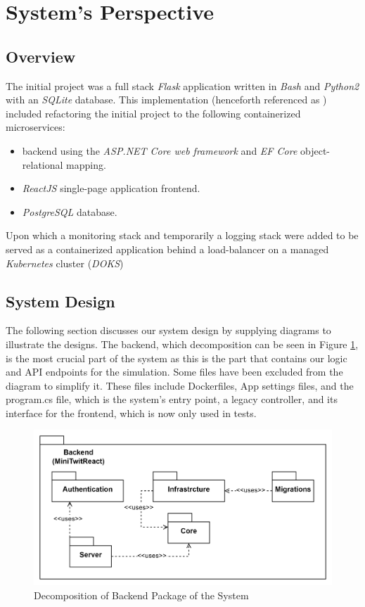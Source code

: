 \section{System's Perspective}
\label{sec:systems_perspective}

\subsection{Overview}
\label{subsec:systems_perspective_overview}
The initial project was a full stack \textit{Flask} application written in \textit{Bash} and \textit{Python2} with an \textit{SQLite} database. 
This implementation (henceforth referenced as \mini) included refactoring the initial project to the following containerized microservices:
\begin{itemize}
    \item \textit{\cs}backend using the \textit{ASP.NET Core web framework} and \textit{EF Core} object-relational mapping.
    \item \textit{ReactJS} single-page application frontend.
    \item \textit{PostgreSQL} database.
\end{itemize}
Upon which a monitoring stack and temporarily a logging stack were added to be served as a containerized application behind a load-balancer on a managed \textit{Kubernetes} cluster (\textit{DOKS})

\subsection{System Design}
\label{subsec:system_design}
The following section discusses our system design by supplying diagrams to illustrate the designs.
The backend, which decomposition can be seen in Figure \ref{fig:decompositionBackend}, is the most crucial part of the system as this is the part that contains our logic and API endpoints for the simulation.
Some files have been excluded from the diagram to simplify it.
These files include Dockerfiles, App settings files, and the program.cs file, which is the system's entry point, a legacy controller, and its interface for the frontend, which is now only used in tests.

\begin{figure}[H]
    \centering
    \includegraphics[scale=0.18]{images/package_class-diagrams/decomposition_backend.png}
    \caption{Decomposition of Backend Package of the \mini System}
    \label{fig:decompositionBackend}
\end{figure}



